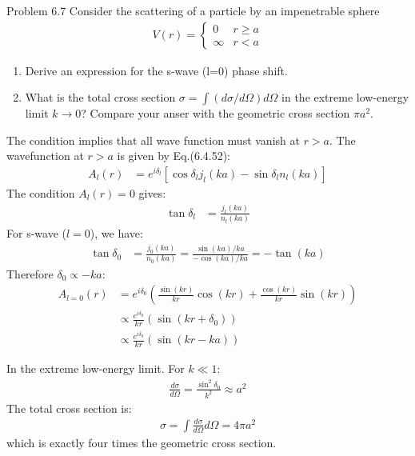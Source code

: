 \documentclass{article}
\begin{document}
\newpage
\begin{section}{Problem 6.7}
Consider the scattering of a particle by an impenetrable sphere
\begin{align*}
	V(r) = \begin{cases}
		       0      & r \geq a \\
		       \infty & r < a
	       \end{cases}
\end{align*}
\begin{enumerate}
	\item Derive an expression for the s-wave (l=0) phase shift.
	\item What is the total cross section $\sigma = \int(d\sigma/d\Omega) d\Omega$ in the extreme low-energy limit $k \to 0$? Compare your anser with the geometric cross section $\pi a^2$.
\end{enumerate}

\begin{tcolorbox}[breakable]
	The condition implies that all wave function must vanish at $r > a$. The wavefunction at $r > a$ is given by Eq.(6.4.52):
	\begin{align*}
		A_l(r) & = e^{i\delta_l} \left[ \cos\delta_l j_l(ka) - \sin\delta_l n_l(ka)\right]
	\end{align*}
	The condition $A_l(r) = 0$ gives:
	\begin{align*}
		\tan \delta_l & = \frac{j_l(ka)}{n_l(ka)}
	\end{align*}
	For s-wave ($l=0$), we have:
	\begin{align*}
		\tan \delta_0 & = \frac{j_0(ka)}{n_0(ka)} = \frac{\sin(ka)/ka}{-\cos(ka)/ka} = -\tan(ka)
	\end{align*}
	Therefore $\delta_0 \propto -ka$:
	\begin{align*}
		A_{l=0}(r) & = e^{i\delta_0} \left( \frac{\sin(kr)}{kr} \cos(kr) + \frac{\cos(kr)}{kr}\sin(kr)\right) \\
		           & \propto \frac{e^{i\delta_0}}{kr} \left( \sin(kr + \delta_0) \right)                      \\
		           & \propto \frac{e^{i\delta_0}}{kr} \left( \sin(kr - ka) \right)
	\end{align*}

	In the extreme low-energy limit. For $k \ll 1$:
	\begin{align*}
		\frac{d\sigma}{d\Omega} = \frac{\sin^2 \delta_0}{k^2} \approx a^2
	\end{align*}
	The total cross section is:
	\begin{align*}
		\sigma = \int \frac{d\sigma}{d\Omega} d\Omega = 4\pi a^2
	\end{align*}
	which is exactly four times the geometric cross section.
\end{tcolorbox}
\end{section}
\end{document}
